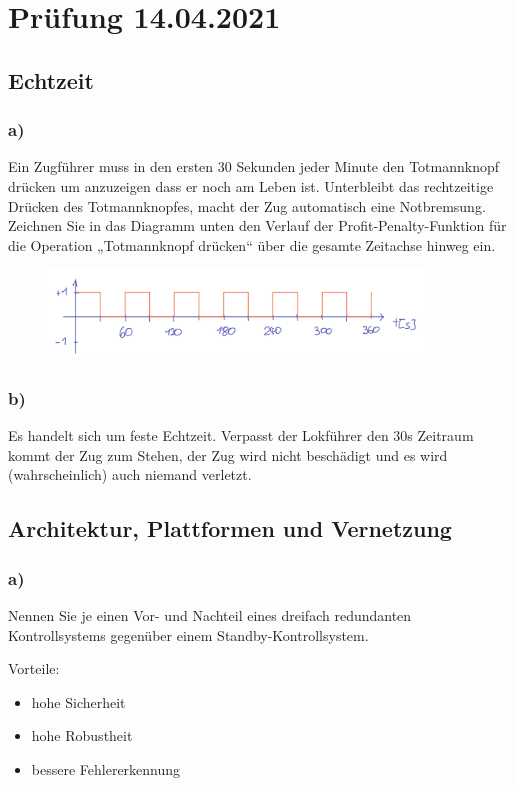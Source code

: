 \section{Prüfung 14.04.2021}
\subsection{Echtzeit}
\subsubsection{a)}
Ein Zugführer muss in den ersten 30 Sekunden jeder Minute den Totmannknopf drücken um
anzuzeigen dass er noch am Leben ist. Unterbleibt das rechtzeitige Drücken des Totmannknopfes,
macht der Zug automatisch eine Notbremsung.
Zeichnen Sie in das Diagramm unten den Verlauf der Profit-Penalty-Funktion für die Operation
„Totmannknopf drücken“ über die gesamte Zeitachse hinweg ein.

\begin{figure}[H]
  \includegraphics[width=10cm]{images/KA140421/1a.PNG}
  \centering
\end{figure}

\subsubsection{b)}
Es handelt sich um feste Echtzeit. Verpasst der Lokführer den 30s Zeitraum kommt der Zug zum Stehen, der 
Zug wird nicht beschädigt und es wird (wahrscheinlich) auch niemand verletzt.

\subsection{Architektur, Plattformen und Vernetzung}
\subsubsection{a)}
Nennen Sie je einen Vor- und Nachteil eines dreifach redundanten Kontrollsystems gegenüber einem
Standby-Kontrollsystem.

Vorteile:
\begin{itemize}
  \item hohe Sicherheit
  \item hohe Robustheit
  \item bessere Fehlererkennung
\end{itemize}

